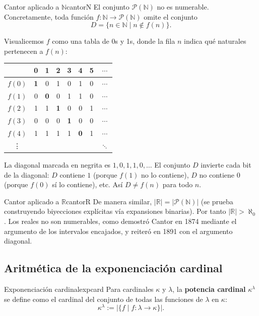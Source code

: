 \begin{ejemplo}{Cantor aplicado a $\mathbb{N}$}{cantorN}
El conjunto $\mathcal{P}(\mathbb{N})$ no es numerable. Concretamente, toda función $f \colon \mathbb{N} \to \mathcal{P}(\mathbb{N})$ omite el conjunto
\[
  D = \{n \in \mathbb{N} \mid n \notin f(n)\}.
\]

Visualicemos $f$ como una tabla de 0s y 1s, donde la fila $n$ indica qué naturales pertenecen a $f(n)$:

\medskip
\begin{center}
\begin{tabular}{c|ccccccc}
 & 0 & 1 & 2 & 3 & 4 & 5 & $\cdots$ \\
\hline
$f(0)$ & \textbf{1} & 0 & 1 & 0 & 1 & 0 & $\cdots$ \\
$f(1)$ & 0 & \textbf{0} & 0 & 1 & 1 & 0 & $\cdots$ \\
$f(2)$ & 1 & 1 & \textbf{1} & 0 & 0 & 1 & $\cdots$ \\
$f(3)$ & 0 & 0 & 0 & \textbf{1} & 0 & 0 & $\cdots$ \\
$f(4)$ & 1 & 1 & 1 & 1 & \textbf{0} & 1 & $\cdots$ \\
\vdots & & & & & & & $\ddots$
\end{tabular}
\end{center}
\medskip

La diagonal marcada en negrita es $1, 0, 1, 1, 0, \ldots$ El conjunto $D$ invierte cada bit de la diagonal: $D$ contiene $1$ (porque $f(1)$ no lo contiene), $D$ no contiene $0$ (porque $f(0)$ sí lo contiene), etc. Así $D \neq f(n)$ para todo $n$.
\end{ejemplo}

\begin{ejemplo}{Cantor aplicado a $\mathbb{R}$}{cantorR}
De manera similar, $|\mathbb{R}| = |\mathcal{P}(\mathbb{N})|$ (se prueba construyendo biyecciones explícitas vía expansiones binarias). Por tanto $|\mathbb{R}| > \aleph_0$. Los reales no son numerables, como demostró Cantor en 1874 \cite{cantor1883} mediante el argumento de los intervalos encajados, y reiteró en 1891 \cite{cantor1891} con el argumento diagonal.
\end{ejemplo}

\subsection{Aritmética de la exponenciación cardinal}

\begin{definicion}{Exponenciación cardinal}{expcard}
Para cardinales $\kappa$ y $\lambda$, la \textbf{potencia cardinal} $\kappa^\lambda$ se define como el cardinal del conjunto de todas las funciones de $\lambda$ en $\kappa$:
\[
  \kappa^\lambda := \bigl|\{f \mid f \colon \lambda \to \kappa\}\bigr|.
\]
\end{definicion}


